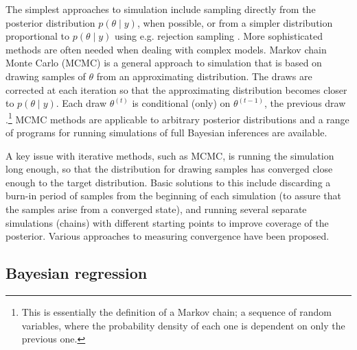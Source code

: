 
The simplest approaches to simulation include sampling directly from the
posterior distribution $p(\theta \mid y)$, when possible, or from a simpler distribution
proportional to $p(\theta \mid y)$ using e.g. rejection sampling \citep{Gelman2013}.
More sophisticated methods are often needed when dealing with complex models.
Markov chain Monte Carlo (MCMC) is a general approach to simulation
that is based on drawing samples of $\theta$ from an approximating
distribution. The draws are corrected at each iteration so that the
approximating distribution becomes closer to $p(\theta \mid y)$.
Each draw $\theta^{(t)}$ is conditional (only) on $\theta^{(t-1)}$, the previous draw
.\footnote{This is essentially the definition of a Markov chain;
a sequence of random variables, where the probability density of each one is
dependent on only the previous one.}
MCMC methods are applicable to arbitrary posterior distributions and a range
of programs for running simulations of full Bayesian inferences are available.

A key issue with iterative methods, such as MCMC, is running the simulation
long enough, so that the distribution for drawing samples has converged 
close enough to the target distribution. Basic solutions to this include discarding a
burn-in period of samples from the beginning of each simulation (to assure
that the samples arise from a converged state), and running several separate
simulations (chains) with different starting points to improve coverage of the
posterior. Various approaches to measuring convergence have been proposed.




\subsection{Bayesian regression}

